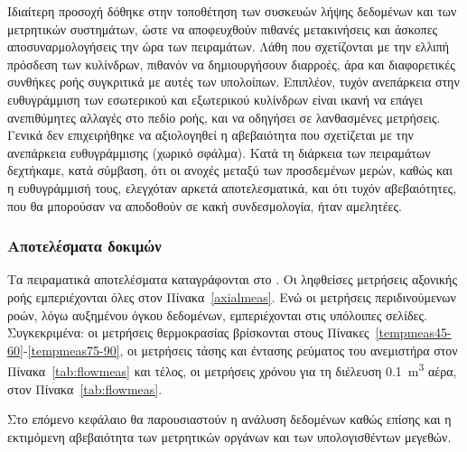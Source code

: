 Ιδιαίτερη προσοχή δόθηκε στην τοποθέτηση των συσκευών λήψης δεδομένων και των μετρητικών συστημάτων, ώστε να αποφευχθούν πιθανές μετακινήσεις και άσκοπες αποσυναρμολογήσεις την ώρα των πειραμάτων. Λάθη που σχετίζονται με την  ελλιπή πρόσδεση των κυλίνδρων, πιθανόν να δημιουργήσουν διαρροές, άρα και διαφορετικές συνθήκες ροής συγκριτικά με αυτές των υπολοίπων. Επιπλέον, τυχόν ανεπάρκεια στην ευθυγράμμιση των εσωτερικού και εξωτερικού κυλίνδρων είναι ικανή να επάγει ανεπιθύμητες αλλαγές στο πεδίο ροής, και να οδηγήσει σε λανθασμένες μετρήσεις. Γενικά δεν επιχειρήθηκε να αξιολογηθεί η αβεβαιότητα που σχετίζεται με την ανεπάρκεια ευθυγράμμισης (χωρικό σφάλμα). Κατά τη διάρκεια των πειραμάτων δεχτήκαμε, κατά σύμβαση, ότι οι ανοχές μεταξύ των προσδεμένων μερών, καθώς και η ευθυγράμμισή τους, ελεγχόταν αρκετά αποτελεσματικά, και ότι τυχόν αβεβαιότητες, που θα μπορούσαν να αποδοθούν σε κακή συνδεσμολογία, ήταν αμελητέες.

\subsubsection{Αποτελέσματα δοκιμών}

\noindent Τα πειραματικά αποτελέσματα καταγράφονται στο . Οι ληφθείσες μετρήσεις αξονικής ροής εμπεριέχονται όλες στον Πίνακα~\ref{axialmeas}. Ενώ οι μετρήσεις περιδινούμενων ροών, λόγω αυξημένου όγκου δεδομένων, εμπεριέχονται στις υπόλοιπες σελίδες. Συγκεκριμένα: οι μετρήσεις θερμοκρασίας βρίσκονται στους Πίνακες~\ref{tempmeas45-60}-\ref{tempmeas75-90}, οι μετρήσεις τάσης και έντασης ρεύματος του ανεμιστήρα στον Πίνακα~\ref{tab:flowmeas} και τέλος, οι μετρήσεις χρόνου για τη διέλευση \qty{0.1}{\metre\cubed} αέρα, στον Πίνακα~\ref{tab:flowmeas}.

Στο επόμενο κεφάλαιο θα παρουσιαστούν η ανάλυση δεδομένων καθώς επίσης και η εκτιμόμενη αβεβαιότητα των μετρητικών οργάνων και των υπολογισθέντων μεγεθών.